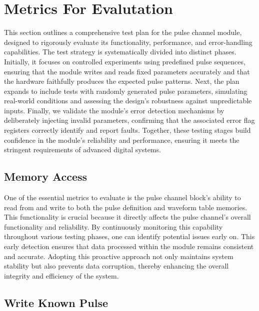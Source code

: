 \chapter{Metrics For Evalutation}

This section outlines a comprehensive test plan for the pulse channel module, designed to rigorously evaluate its functionality, performance, and error-handling capabilities. The test strategy is systematically divided into distinct phases. Initially, it focuses on controlled experiments using predefined pulse sequences, ensuring that the module writes and reads fixed parameters accurately and that the hardware faithfully produces the expected pulse patterns. Next, the plan expands to include tests with randomly generated pulse parameters, simulating real-world conditions and assessing the design's robustness against unpredictable inputs. Finally, we validate the module's error detection mechanisms by deliberately injecting invalid parameters, confirming that the associated error flag registers correctly identify and report faults. Together, these testing stages build confidence in the module's reliability and performance, ensuring it meets the stringent requirements of advanced digital systems.

\section{Memory Access}

One of the essential metrics to evaluate is the pulse channel block's ability to read from and write to both the pulse definition and waveform table memories. This functionality is crucial because it directly affects the pulse channel's overall functionality and reliability. By continuously monitoring this capability throughout various testing phases, one can identify potential issues early on. This early detection ensures that data processed within the module remains consistent and accurate. Adopting this proactive approach not only maintains system stability but also prevents data corruption, thereby enhancing the overall integrity and efficiency of the system.

\section{Write Known Pulse}

